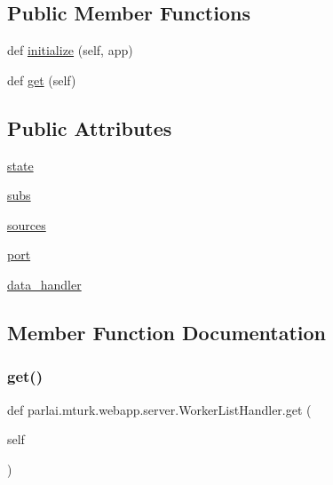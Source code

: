 \subsection*{Public Member Functions}
\begin{DoxyCompactItemize}
\item 
def \hyperlink{classparlai_1_1mturk_1_1webapp_1_1server_1_1WorkerListHandler_ad375655741a045539a790aa1eb8878df}{initialize} (self, app)
\item 
def \hyperlink{classparlai_1_1mturk_1_1webapp_1_1server_1_1WorkerListHandler_a3383de3fd04a665c4a8515f5b24298e0}{get} (self)
\end{DoxyCompactItemize}
\subsection*{Public Attributes}
\begin{DoxyCompactItemize}
\item 
\hyperlink{classparlai_1_1mturk_1_1webapp_1_1server_1_1WorkerListHandler_a148a2a0c1abac1c1e910053612a68100}{state}
\item 
\hyperlink{classparlai_1_1mturk_1_1webapp_1_1server_1_1WorkerListHandler_a45a7642674a9e26e63898339dd8f77eb}{subs}
\item 
\hyperlink{classparlai_1_1mturk_1_1webapp_1_1server_1_1WorkerListHandler_ad75402572f58d507dacf6db95960239e}{sources}
\item 
\hyperlink{classparlai_1_1mturk_1_1webapp_1_1server_1_1WorkerListHandler_a92bb448ef812ff9ff294d703078c5cb0}{port}
\item 
\hyperlink{classparlai_1_1mturk_1_1webapp_1_1server_1_1WorkerListHandler_ac2d150c97af3040146f49dc7d9f178c1}{data\+\_\+handler}
\end{DoxyCompactItemize}


\subsection{Member Function Documentation}
\mbox{\label{classparlai_1_1mturk_1_1webapp_1_1server_1_1WorkerListHandler_a3383de3fd04a665c4a8515f5b24298e0}} 
\subsubsection{\texorpdfstring{get()}{get()}}
{\footnotesize\ttfamily def parlai.\+mturk.\+webapp.\+server.\+Worker\+List\+Handler.\+get (\begin{DoxyParamCaption}\item[{}]{self }\end{DoxyParamCaption})}

